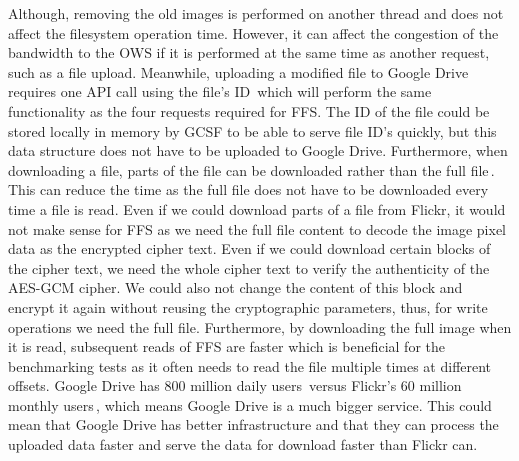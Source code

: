 Although, removing the old images is performed on another thread and does not affect the filesystem operation time. However, it can affect the congestion of the bandwidth to the \gls{OWS} if it is performed at the same time as another request, such as a file upload. Meanwhile, uploading a modified file to Google Drive requires one \gls{API} call using the file's ID\,\cite{FilesUpdateDrive2022} which will perform the same functionality as the four requests required for \gls{FFS}. The ID of the file could be stored locally in memory by \gls{GCSF} to be able to serve file ID's quickly, but this data structure does not have to be uploaded to Google Drive. Furthermore, when downloading a file, parts of the file can be downloaded rather than the full file\,\cite{googleDownloadFilesDrive2022}. This can reduce the time as the full file does not have to be downloaded every time a file is read. Even if we could download parts of a file from Flickr, it would not make sense for \gls{FFS} as we need the full file content to decode the image pixel data as the encrypted cipher text. Even if we could download certain blocks of the cipher text, we need the whole cipher text to verify the authenticity of the \mbox{\gls{AES}-\gls{GCM}} cipher. We could also not change the content of this block and encrypt it again without reusing the cryptographic parameters, thus, for write operations we need the full file. Furthermore, by downloading the full image when it is read, subsequent reads of \gls{FFS} are faster which is beneficial for the benchmarking tests as it often needs to read the file multiple times at different offsets. Google Drive has 800 million daily users\,\cite{lardinoisGoogleUpdatesDrive2017} versus Flickr's 60 million monthly users\,\cite{campbellFlickrStatistics20222022}, which means Google Drive is a much bigger service. This could mean that Google Drive has better infrastructure and that they can process the uploaded data faster and serve the data for download faster than Flickr can.

%
%
% 
%
%
%
% 
%
%
%
%
%

